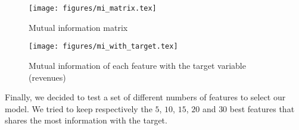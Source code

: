\begin{figure}[H]
	\centering
	\texttt{[image: figures/mi\_matrix.tex]}
	\caption{Mutual information matrix}
	\label{fig:mi_matrix}
\end{figure}

\begin{figure}[H]
	\centering
	\texttt{[image: figures/mi\_with\_target.tex]}
	\caption{Mutual information of each feature with the target variable (revenues)}
	\label{fig:MI_with_target}
\end{figure}

Finally, we decided to test a set of different numbers of features to select our model. We tried to keep respectively the $5$, $10$, $15$, $20$ and $30$ best features that shares the most information with the target.